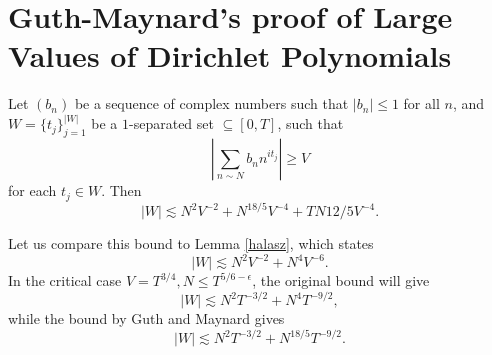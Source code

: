 \section{Guth-Maynard's proof of Large Values of Dirichlet Polynomials}
\begin{theorem}
    Let $(b_n)$ be a sequence of complex numbers such that $|b_n|\leq 1$ for all $n$, and $W=\{t_j\}_{j=1}^{|W|}$ be a $1$-separated set $\subseteq [0,T]$, such that \[
    \left|\sum_{n\sim N}b_n n^{it_j}\right|\geq V
    \]
    for each $t_j\in W$. Then \[
    |W|\lesssim N^2V^{-2}+N^{18/5}V^{-4}+TN{12/5}V^{-4}.
    \]
\end{theorem}
Let us compare this bound to Lemma \ref{halasz}, which states \[
|W|\lesssim N^2V^{-2}+N^4V^{-6}.
\]
In the critical case $V=T^{3/4}, N\leq T^{5/6-\epsilon}$, the original bound will give \[
|W|\lesssim N^2T^{-3/2}+N^4T^{-9/2},
\]
while the bound by Guth and Maynard gives \[
|W|\lesssim N^2T^{-3/2}+N^{18/5}T^{-9/2}.
\]